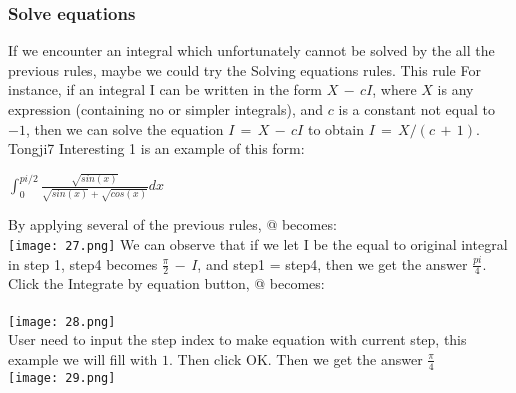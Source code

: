 \documentclass[titlepage]{article}
\makeatletter
\newcommand*{\rom}[1]{\expandafter\@slowromancap\romannumeral #1@}
\makeatother
\begin{document}
\subsubsection{Solve equations}
If we encounter an integral which unfortunately cannot be solved by the all the previous rules, maybe we could try the Solving equations rules. This rule For instance, if an integral I can be written
in the form $X\,−\,cI$, where $X$ is any expression (containing no or simpler integrals),
and $c$ is a constant not equal to $−1$, then we can solve the equation $I\, =\, X\, −\, cI$
to obtain $I\, =\, X/(c\, +\, 1)$. Tongji7 Interesting 1 is an example of this form:
\begin{center}
$\int_{0}^{pi/2} \frac{\sqrt{sin(x)}}{\sqrt{sin(x)} + \sqrt{cos(x)}} dx$
\end{center}
By applying several of the previous rules, \rom{3} becomes:\\
\texttt{[image: 27.png]}
We can observe that if we let I be the equal to original integral in step 1, step4 becomes $\frac{\pi}{2}\,-\,I$, and step1 = step4, then we get the answer $\frac{pi}{4}$. Click the \colorbox{mygray}{Integrate by equation} button, \rom{5} becomes:\\
\\
\texttt{[image: 28.png]}\\
User need to input the step index to make equation with current step, this example we will fill with $1$. Then click \colorbox{mygray}{OK}. Then we get the answer $\frac{\pi}{4}$\\
\texttt{[image: 29.png]}
\end{document}
